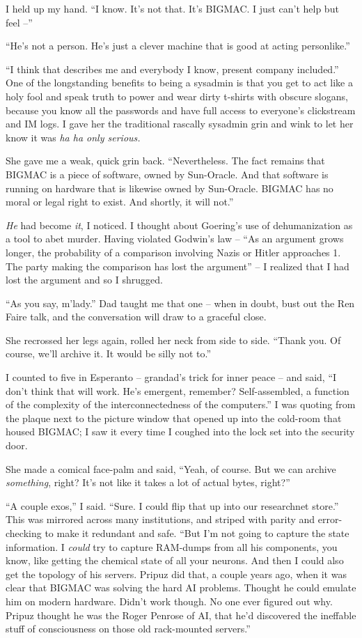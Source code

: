 I held up my hand. “I know. It's not that. It's BIGMAC. I just can't 
help but feel --”

“He's not a person. He's just a clever machine that is good at acting 
personlike.”

“I think that describes me and everybody I know, present company 
included.” One of the longstanding benefits to being a sysadmin is 
that you get to act like a holy fool and speak truth to power and wear 
dirty t-shirts with obscure slogans, because you know all the passwords 
and have full access to everyone's clickstream and IM logs. I gave her 
the traditional rascally sysadmin grin and wink to let her know it was 
\emph{ha ha only serious.}

She gave me a weak, quick grin back. “Nevertheless. The fact remains 
that BIGMAC is a piece of software, owned by Sun-Oracle. And that 
software is running on hardware that is likewise owned by Sun-Oracle. 
BIGMAC has no moral or legal right to exist. And shortly, it will 
not.”

\emph{He} had become \emph{it}, I noticed. I thought about Goering's 
use of dehumanization as a tool to abet murder. Having violated 
Godwin's law -- “As an argument grows longer, the probability of a 
comparison involving Nazis or Hitler approaches 1. The party making the 
comparison has lost the argument” -- I realized that I had lost the 
argument and so I shrugged.

“As you say, m'lady.” Dad taught me that one -- when in doubt, bust 
out the Ren Faire talk, and the conversation will draw to a graceful 
close.

She recrossed her legs again, rolled her neck from side to side. 
“Thank you. Of course, we'll archive it. It would be silly not to.”

I counted to five in Esperanto -- grandad's trick for inner peace -- 
and said, “I don't think that will work. He's emergent, remember? 
Self-assembled, a function of the complexity of the interconnectedness 
of the computers.” I was quoting from the plaque next to the picture 
window that opened up into the cold-room that housed BIGMAC; I saw it 
every time I coughed into the lock set into the security door.

She made a comical face-palm and said, “Yeah, of course. But we can 
archive \emph{something}, right? It's not like it takes a lot of actual 
bytes, right?”

“A couple exos,” I said. “Sure. I could flip that up into our 
researchnet store.” This was mirrored across many institutions, and 
striped with parity and error-checking to make it redundant and safe. 
“But I'm not going to capture the state information. I \emph{could} 
try to capture RAM-dumps from all his components, you know, like 
getting the chemical state of all your neurons. And then I could also 
get the topology of his servers. Pripuz did that, a couple years ago, 
when it was clear that BIGMAC was solving the hard AI problems. Thought 
he could emulate him on modern hardware. Didn't work though. No one 
ever figured out why. Pripuz thought he was the Roger Penrose of AI, 
that he'd discovered the ineffable stuff of consciousness on those old 
rack-mounted servers.”

